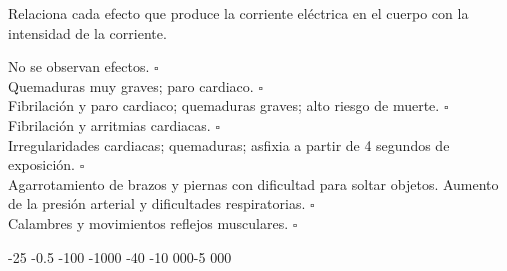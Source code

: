 Relaciona cada efecto que produce la corriente eléctrica en el cuerpo con la intensidad de la corriente.
\begin{multicols}{2}
    \begin{choices}
        \choice No se observan efectos.                                                                                                                      \hfill  $\square$\\ %
        \choice Quemaduras muy graves; paro cardiaco.                                                                                                        \hfill  $\square$\\ %
        \choice Fibrilación y paro cardiaco; quemaduras graves; alto riesgo de muerte.                                                                       \hfill  $\square$\\ %
        \choice Fibrilación y arritmias cardiacas.                                                                                                           \hfill  $\square$\\ %
        \choice Irregularidades cardiacas; quemaduras; asfixia a partir de 4 segundos de exposición.                                                         \hfill  $\square$\\ %
        \choice Agarrotamiento de brazos y piernas con dificultad para soltar objetos. Aumento de la presión arterial y dificultades respiratorias.          \hfill  $\square$\\ %
        \choice Calambres y movimientos reflejos musculares.                                                                                                 \hfill  $\square$\\ %
    \end{choices}
    \begin{checkboxes}
        -25        \vspace{1cm}
        -0.5        \vspace{1cm}
        -100       \vspace{1cm}
        -1000     \vspace{1cm}
        -40        \vspace{1cm}
        -10       \vspace{1cm}
         000-5 000  \vspace{1cm}
    \end{checkboxes}
\end{multicols}